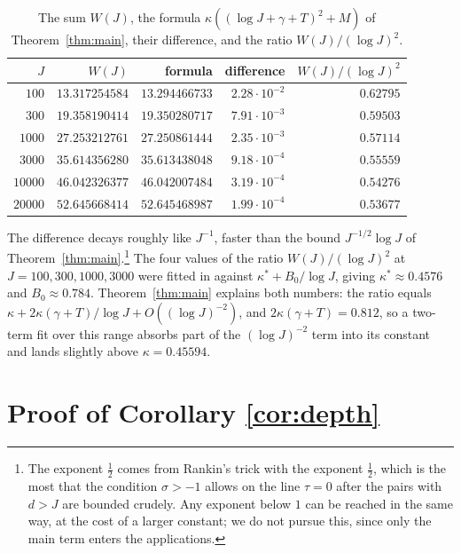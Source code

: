 \documentclass{amsart}
\theoremstyle{definition}
\theoremstyle{remark}
\numberwithin{equation}{section}
\begin{document}
\begin{table}[ht]
\centering
\caption{The sum $W(J)$, the formula $\kappa((\log J+\gamma+T)^2+M)$ of Theorem~\ref{thm:main}, their difference, and the ratio $W(J)/(\log J)^2$.}
\label{tab:W}
\begin{tabular}{rrrrr}
\toprule
$J$ & $W(J)$ & formula & difference & $W(J)/(\log J)^2$\\
\midrule
$100$ & $13.317254584$ & $13.294466733$ & $2.28\cdot10^{-2}$ & $0.62795$\\
$300$ & $19.358190414$ & $19.350280717$ & $7.91\cdot10^{-3}$ & $0.59503$\\
$1000$ & $27.253212761$ & $27.250861444$ & $2.35\cdot10^{-3}$ & $0.57114$\\
$3000$ & $35.614356280$ & $35.613438048$ & $9.18\cdot10^{-4}$ & $0.55559$\\
$10000$ & $46.042326377$ & $46.042007484$ & $3.19\cdot10^{-4}$ & $0.54276$\\
$20000$ & $52.645668414$ & $52.645468987$ & $1.99\cdot10^{-4}$ & $0.53677$\\
\bottomrule
\end{tabular}
\end{table}

The difference decays roughly like $J^{-1}$, faster than the bound $J^{-1/2}\log J$ of Theorem~\ref{thm:main}.\footnote{The exponent $\frac12$ comes from Rankin's trick with the exponent $\frac12$, which is the most that the condition $\sigma>-1$ allows on the line $\tau=0$ after the pairs with $d>J$ are bounded crudely. Any exponent below $1$ can be reached in the same way, at the cost of a larger constant; we do not pursue this, since only the main term enters the applications.} The four values of the ratio $W(J)/(\log J)^2$ at $J=100,300,1000,3000$ were fitted in \cite{Dah} against $\kappa^*+B_0/\log J$, giving $\kappa^*\approx0.4576$ and $B_0\approx0.784$. Theorem~\ref{thm:main} explains both numbers: the ratio equals $\kappa+2\kappa(\gamma+T)/\log J+O((\log J)^{-2})$, and $2\kappa(\gamma+T)=0.812$, so a two-term fit over this range absorbs part of the $(\log J)^{-2}$ term into its constant and lands slightly above $\kappa=0.45594$.

\section{Proof of Corollary \ref{cor:depth}}
\end{document}
